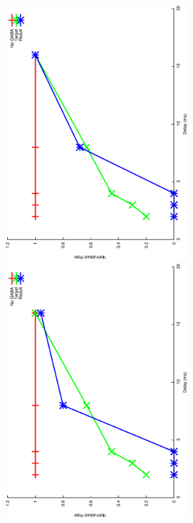 \documentclass{article}
\begin{document}
\includegraphics[keepaspectratio=true,angle=-90,width=0.6\textwidth]{DS_ClickRecovery_result.14.eps}\clearpage
\includegraphics[keepaspectratio=true,angle=-90,width=0.6\textwidth]{DS_ClickRecovery_result.15.eps}\clearpage
\end{document}
